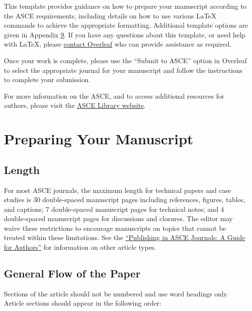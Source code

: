 \documentclass[
  NewProceedings,
  letterpaper]{./assets/ascelike-new}
\begin{document}
This template provides guidance on how to prepare your manuscript
according to the ASCE requirements, including details on how to use
various LaTeX commands to achieve the appropriate formatting. Additional
template options are given in Appendix
\protect\hyperlink{app:options}{9}. If you have any questions about this
template, or need help with LaTeX, please
\href{https://www.overleaf.com/contact}{contact Overleaf} who can
provide assistance as required.

Once your work is complete, please use the ``Submit to ASCE'' option in
Overleaf to select the appropriate journal for your manuscript and
follow the instructions to complete your submission.

For more information on the ASCE, and to access additional resources for
authors, please visit the
\href{http://ascelibrary.org/page/authors}{ASCE Library website}.

\hypertarget{preparing-your-manuscript}{%
\section{Preparing Your Manuscript}\label{preparing-your-manuscript}}

\hypertarget{length}{%
\subsection{Length}\label{length}}

For most ASCE journals, the maximum length for technical papers and case
studies is 30 double-spaced manuscript pages including references,
figures, tables, and captions; 7 double-spaced manuscript pages for
technical notes; and 4 double-spaced manuscript pages for discussions
and closures. The editor may waive these restrictions to encourage
manuscripts on topics that cannot be treated within these limitations.
See the
\href{https://ascelibrary.org/doi/pdf/10.1061/9780784479018}{``Publishing
in ASCE Journals: A Guide for Authors''} for information on other
article types.

\hypertarget{general-flow-of-the-paper}{%
\subsection{General Flow of the Paper}\label{general-flow-of-the-paper}}

Sections of the article should not be numbered and use word headings
only. Article sections should appear in the following order:
\end{document}
